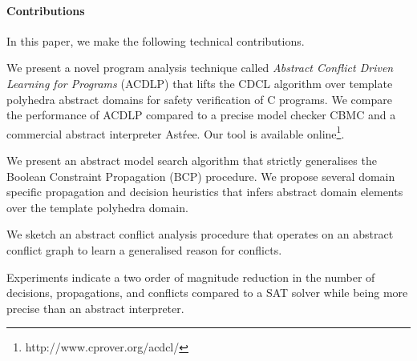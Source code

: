 \paragraph{Contributions}
In this paper, we make the following technical contributions.
%
\begin{compactenum}
\item We present a novel program analysis technique called {\em Abstract 
Conflict Driven Learning for Programs} (ACDLP) that lifts the CDCL algorithm 
over template polyhedra abstract domains for safety verification of C programs.  
We compare the performance of ACDLP compared to a precise model checker CBMC and a 
commercial abstract interpreter Ast{\'r}ee.  Our tool is available 
online\footnote{http://www.cprover.org/acdcl/}. 

\item We present an abstract model search algorithm that strictly 
generalises the Boolean Constraint Propagation (BCP) procedure. We 
propose several domain specific propagation and decision heuristics 
that infers abstract domain elements over the template polyhedra domain.   
\item We sketch an abstract conflict analysis procedure that operates on an 
abstract conflict graph to learn a generalised reason for conflicts.  
 
\item  Experiments indicate a two order of magnitude reduction 
in the number of decisions, propagations, and conflicts compared 
to a SAT solver while being more precise than an abstract interpreter.  
\end{compactenum}
